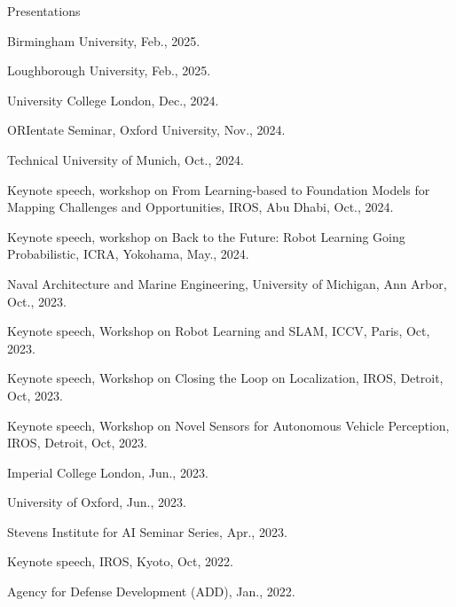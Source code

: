 \begin{rSection}{Presentations}

\begin{pubSubsectionNum}{}
  \item Birmingham University, Feb., 2025.
  
  \item Loughborough University, Feb., 2025.

  \item University College London, Dec., 2024.

  \item ORIentate Seminar, Oxford University, Nov., 2024.

  \item Technical University of Munich, Oct., 2024.

  \item Keynote speech, workshop on From Learning-based to Foundation Models for Mapping Challenges and Opportunities, IROS, Abu Dhabi, Oct., 2024.

  \item Keynote speech, workshop on Back to the Future: Robot Learning Going Probabilistic, ICRA, Yokohama, May., 2024.

  \item Naval Architecture and Marine Engineering, University of Michigan, Ann Arbor, Oct., 2023.

  \item Keynote speech, Workshop on Robot Learning and SLAM, ICCV, Paris, Oct, 2023.

  \item Keynote speech, Workshop on Closing the Loop on Localization, IROS, Detroit, Oct, 2023.

  \item Keynote speech, Workshop on Novel Sensors for Autonomous Vehicle Perception, IROS, Detroit, Oct, 2023.

  \item Imperial College London, Jun., 2023.

  \item University of Oxford, Jun., 2023.

  \item Stevens Institute for AI Seminar Series, Apr., 2023.

  \item Keynote speech, IROS, Kyoto, Oct, 2022.

  \item Agency for Defense Development (ADD), Jan., 2022.


\end{pubSubsectionNum}
\end{rSection}
